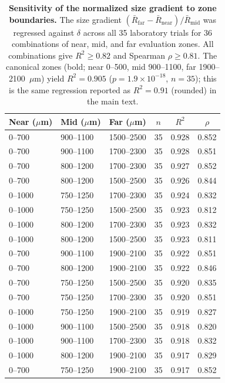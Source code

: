 \documentclass[11pt]{article}
\begin{document}
\clearpage


\begin{table}[H]
\centering
\caption{\textbf{Sensitivity of the normalized size gradient to zone boundaries.} The size gradient $(\bar{R}_{\mathrm{far}} - \bar{R}_{\mathrm{near}})/\bar{R}_{\mathrm{mid}}$ was regressed against $\delta$ across all 35 laboratory trials for 36 combinations of near, mid, and far evaluation zones. All combinations give $R^2 \geq 0.82$ and Spearman $\rho \geq 0.81$. The canonical zones (bold; near 0--500, mid 900--1100, far 1900--2100~$\mu$m) yield $R^2 = 0.905$ ($p = 1.9 \times 10^{-18}$, $n = 35$); this is the same regression reported as $R^2 = 0.91$ (rounded) in the main text.}
\label{tab:sensitivity}
\vspace{0.5em}
\small
\begin{tabular}{lllccc}
\toprule
Near ($\mu$m) & Mid ($\mu$m) & Far ($\mu$m) & $n$ & $R^2$ & $\rho$ \\
\midrule
0--700 & 900--1100 & 1500--2500 & 35 & 0.928 & 0.852 \\
0--700 & 900--1100 & 1700--2300 & 35 & 0.928 & 0.851 \\
0--700 & 800--1200 & 1700--2300 & 35 & 0.927 & 0.852 \\
0--700 & 800--1200 & 1500--2500 & 35 & 0.926 & 0.844 \\
0--1000 & 750--1250 & 1700--2300 & 35 & 0.924 & 0.832 \\
0--1000 & 750--1250 & 1500--2500 & 35 & 0.923 & 0.812 \\
0--1000 & 800--1200 & 1700--2300 & 35 & 0.923 & 0.832 \\
0--1000 & 800--1200 & 1500--2500 & 35 & 0.923 & 0.811 \\
0--700 & 900--1100 & 1900--2100 & 35 & 0.922 & 0.851 \\
0--700 & 800--1200 & 1900--2100 & 35 & 0.922 & 0.846 \\
0--700 & 750--1250 & 1500--2500 & 35 & 0.920 & 0.835 \\
0--700 & 750--1250 & 1700--2300 & 35 & 0.920 & 0.851 \\
0--1000 & 750--1250 & 1900--2100 & 35 & 0.919 & 0.827 \\
0--1000 & 900--1100 & 1500--2500 & 35 & 0.918 & 0.820 \\
0--1000 & 900--1100 & 1700--2300 & 35 & 0.918 & 0.832 \\
0--1000 & 800--1200 & 1900--2100 & 35 & 0.917 & 0.829 \\
0--700 & 750--1250 & 1900--2100 & 35 & 0.917 & 0.852 \\

\end{tabular}
\end{table}
\end{document}
